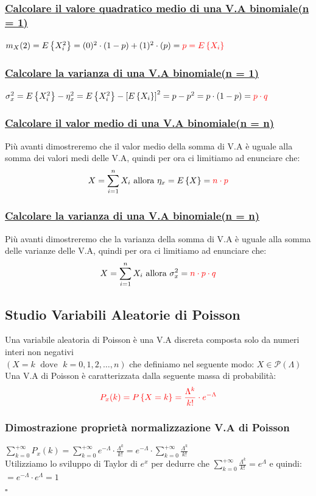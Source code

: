 \documentclass{article}
\begin{document}
\subsubsection{\underline{Calcolare il valore quadratico medio di una V.A binomiale(n = 1)}}
$m_X(2) = E \left\{ X_i^2 \right\} = (0)^2 \cdot (1-p) + (1)^2 \cdot (p) = \color{red}p = E\left\{X_i\right\}$
\subsubsection{\underline{Calcolare la varianza di una V.A binomiale(n = 1)}}
$\sigma_x^2 = E\left\{ X_i^2 \right\} - \eta_x^2 = E\left\{ X_i^2 \right\} - \left[ E\left\{ X_i \right\}\right]^2 = p-p^2 = p\cdot (1-p) = \color{red} p \cdot q$
\subsubsection{\underline{Calcolare il valor medio di una V.A binomiale(n = n)}}
Più avanti dimostreremo che il valor medio della somma di V.A è uguale alla somma dei valori medi delle V.A, quindi per ora ci limitiamo ad enunciare che:
\[X = \sum_{i=1}^{n} X_i \text{ allora } \eta_x = E\left\{X\right\} = \color{red} n \cdot p\]
\subsubsection{\underline{Calcolare la varianza di una V.A binomiale(n = n)}}
Più avanti dimostreremo che la varianza della somma di V.A è uguale alla somma delle varianze delle V.A, quindi per ora ci limitiamo ad enunciare che:
\[X = \sum_{i=1}^{n} X_i \text{ allora } \sigma^2_x = \color{red} n \cdot p \cdot q\]

\subsection{Studio Variabili Aleatorie di Poisson}
Una variabile aleatoria di Poisson è una V.A discreta composta solo da numeri interi non negativi \\ $\left(X = k \;\text{ dove }\; k=0,1,2,\dots,n\right)$ che definiamo nel seguente modo: $X \in \mathcal{P}(\Lambda)$ \\
Una V.A di Poisson è caratterizzata dalla seguente massa di probabilità:
\[\color{red} P_x(k) = P \left\{X = k\right\} = \frac{\Lambda^k}{k!} \cdot e^{-\Lambda}\]
\subsubsection{Dimostrazione proprietà normalizzazione V.A di Poisson}
$\sum_{k=0}^{+\infty} P_x(k) = \sum_{k=0}^{+\infty} e^{-\Lambda} \cdot \frac{\Lambda^k}{k!} = e^{-\Lambda} \cdot \sum_{k=0}^{+\infty} \frac{\Lambda^k}{k!}$ \\
Utilizziamo lo sviluppo di Taylor di $e^x$ per dedurre che $\sum_{k=0}^{+\infty} \frac{\Lambda^k}{k!} = e^\Lambda$ e quindi: \\
$= e^{-\Lambda} \cdot e^\Lambda = 1$ \\
\hspace*{0pt}\hfill $\square$
\end{document}

